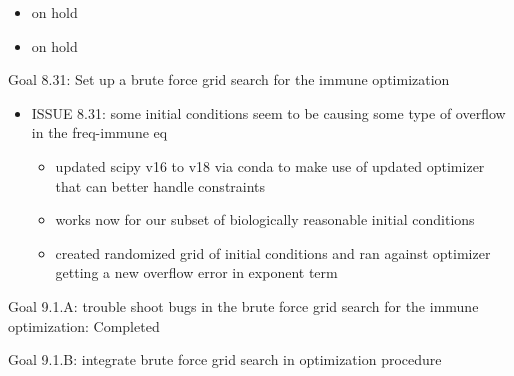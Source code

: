 \documentclass[letterpaper,index=totoc,hyperref,openany]{labbook} %
\begin{document}
\begin{itemize}
\item{ on hold}
\end{itemize}

\begin{itemize}
\item{ on hold}
\end{itemize}


Goal 8.31: Set up a brute force grid search for the immune optimization
\begin{itemize}

\item{ISSUE 8.31: some initial conditions seem to be causing some type of overflow in the freq-immune eq}
	\begin{itemize}
        \item{updated scipy v16 to v18 via conda to make use of updated optimizer that can better handle constraints}
        \item{works now for our subset of biologically reasonable initial conditions}
        \item{created randomized grid of initial conditions and ran against optimizer getting a new overflow error in exponent term}
 	\end{itemize}
\end{itemize}



Goal 9.1.A: trouble shoot bugs in the brute force grid search for the immune optimization: Completed

Goal 9.1.B: integrate brute force grid search in optimization procedure
\end{document}
